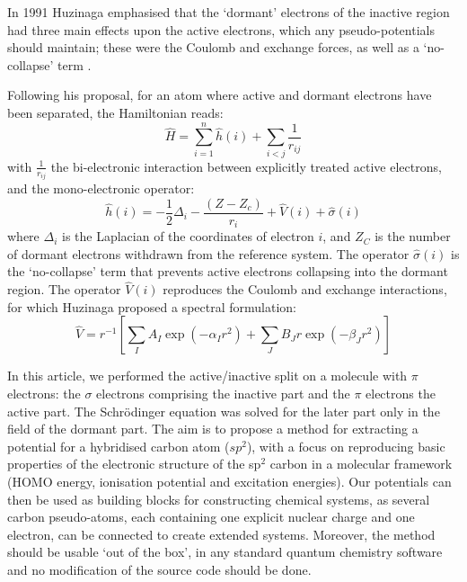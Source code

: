 \documentclass[12pt]{article}
\begin{document}
In 1991 Huzinaga emphasised that the `dormant' electrons of the inactive region had three main effects upon the active electrons, which any pseudo-potentials should maintain; these were the Coulomb and exchange forces, as well as a `no-collapse' term \cite{huzinaga_effective_1991}.

Following his proposal, for an atom where active and dormant electrons have been separated, the Hamiltonian reads:
\begin{equation}
\label{eq:atomicHamiltonian}
\hat{H} = \sum_{i=1}^n \hat{h}(i) +\sum_{i<j}\frac{1}{r_{ij}}
\end{equation}
with $\frac{1}{r_{ij}}$ the bi-electronic interaction
between explicitly treated active electrons, and
the mono-electronic operator:
\begin{equation}
\label{eq:monoElectronicOperator}
\hat{h}(i) = -\frac{1}{2}\Delta_i - \frac{(Z-Z_c)}{r_i}+\hat{V}(i) + \hat{\sigma}(i)
\end{equation}
where $\Delta_i$ is the Laplacian of the coordinates of electron $i$, and 
$Z_C$ is the number of dormant electrons withdrawn from the reference system.
The operator $\hat{\sigma}(i)$ is the `no-collapse' term that prevents active electrons
collapsing into the dormant region. The operator $\hat{V}(i)$ reproduces the 
Coulomb and exchange interactions, for which Huzinaga proposed a spectral formulation:
\begin{equation}
\label{eq:HuzinagaMPVersion1Potential}
\hat{V} = r^{-1}\left[\sum_IA_I\exp(-\alpha_I r^2)+\sum_JB_Jr\exp(-\beta_J r^2)\right]
\end{equation}

In this article, we performed the active/inactive split on a molecule with $\pi$ electrons: the $\sigma$ electrons comprising the inactive part and the $\pi$ electrons the active part.
The Schr\"odinger equation was solved for the later part only in the field of the dormant part.
The aim is to propose a method for extracting a potential for a hybridised carbon atom 
($sp^2$), with a focus on reproducing basic properties of the electronic structure of the sp$^2$ carbon in a molecular framework 
(HOMO energy, ionisation potential and excitation energies). Our potentials can then be used as 
building blocks for constructing chemical systems, as several carbon pseudo-atoms,
each containing one explicit nuclear charge and one electron, can be connected to create extended
systems.
Moreover, the method should be usable `out of the box', in any standard quantum chemistry software
and no modification of the source code should be done.
\end{document}

